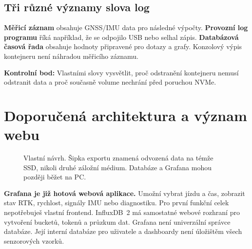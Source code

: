 \documentclass[11pt,a4paper]{article}
\newcommand{\kontrola}[1]{\par\noindent\textbf{Kontrolní bod:} #1\par}
\begin{document}
\subsection{Tři různé významy slova log}
\textbf{Měřicí záznam} obsahuje GNSS/IMU data pro následné výpočty. \textbf{Provozní log programu} říká například, že se odpojilo USB nebo selhal zápis. \textbf{Databázová časová řada} obsahuje hodnoty připravené pro dotazy a grafy. Konzolový výpis kontejneru není náhradou měřicího záznamu.

\kontrola{Vlastními slovy vysvětlit, proč odstranění kontejneru nemusí odstranit data a proč současně volume nechrání před poruchou NVMe.}

\clearpage
\section{Doporučená architektura a význam webu}
\begin{figure}[htbp]\centering
{}
\caption{Vlastní návrh. Šipka exportu znamená odvozená data na témže SSD, nikoli druhé záložní médium. Databáze a Grafana mohou později běžet na PC.}
\end{figure}

\textbf{Grafana je již hotová webová aplikace.} Umožní vybrat jízdu a čas, zobrazit stav RTK, rychlost, signály IMU nebo diagnostiku. Pro první funkční celek nepotřebuješ vlastní frontend. InfluxDB~2 má samostatné webové rozhraní pro vytvoření bucketů, tokenů a průzkum dat. Grafana není univerzální správce databáze. Její interní databáze pro uživatele a dashboardy není úložištěm všech senzorových vzorků.\cite{grafana-start,influx-install}
\end{document}
